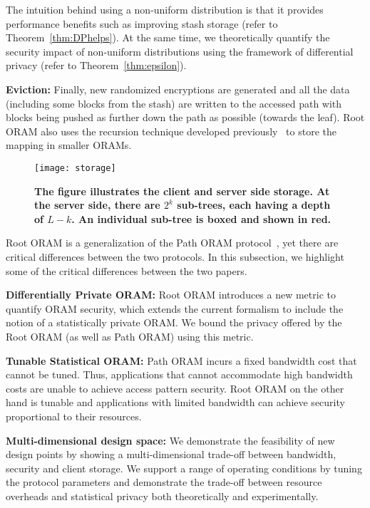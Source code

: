 \documentclass[USenglish,oneside,twocolumn]{article}
\makeatletter
\newcommand{\ourprotocol}{Root ORAM}
\let\origsubsection\subsection
\renewcommand\subsection{\@ifstar{\starsubsection}{\nostarsubsection}}
\newcommand\nostarsubsection[1]
{\subsectionprelude\origsubsection{#1}\subsectionpostlude}
\newcommand\starsubsection[1]
{\subsectionprelude\origsubsection*{#1}\subsectionpostlude}
\newcommand\subsectionprelude{\vspace{-1.5em}}
\newcommand\subsectionpostlude{\vspace{-1em}}
\makeatother
\begin{document}
The intuition behind using a non-uniform distribution is that it provides performance benefits such as improving stash storage (refer to Theorem~\ref{thm:DPhelps}). At the same time, we theoretically quantify the security impact of non-uniform distributions using the framework of differential privacy (refer to Theorem~\ref{thm:epsilon}).

\textbf{Eviction: }Finally, new randomized encryptions are generated and all the data (including some blocks from the stash) are written to the accessed path with blocks being pushed as further down the path as possible (towards the leaf). \ourprotocol{} also uses the recursion technique developed previously~\cite{tree_based_orams, SSSoram, pathoram} to store the mapping in smaller ORAMs. 


\begin{figure*}
\center
\texttt{[image: storage]}
\vspace{-5pt}
\caption{\textbf{The figure illustrates the client and server side storage. At the server side, there are $2^k$ sub-trees, each having a depth of $L-k$. An individual sub-tree is boxed and shown in red. }}
\label{fig:rootoram}
\vspace{-4pt}
\end{figure*}


\subsection{Comparison with Path ORAM~\cite{pathoram}}
\ourprotocol{} is a generalization of the Path ORAM protocol~\cite{pathoram}, yet there are critical differences between the two protocols. In this subsection, we highlight some of the critical differences between the two papers.

\textbf{Differentially Private ORAM: }\ourprotocol{} introduces a new metric to quantify ORAM security, which extends the current formalism to include the notion of a statistically private ORAM. We bound the privacy offered by the \ourprotocol{} (as well as Path ORAM) using this metric.

\textbf{Tunable Statistical ORAM: }Path ORAM incurs a fixed bandwidth cost that cannot be tuned. Thus, applications that cannot accommodate high bandwidth costs are unable to achieve access pattern security. \ourprotocol{} on the other hand is tunable and applications with limited bandwidth can achieve security proportional to their resources. 

\textbf{Multi-dimensional design space: }We demonstrate the feasibility of new design points by showing a multi-dimensional trade-off between bandwidth, security and client storage. We support a range of operating conditions by tuning the protocol parameters and demonstrate the trade-off between resource overheads and statistical privacy both theoretically and experimentally.
\end{document}
